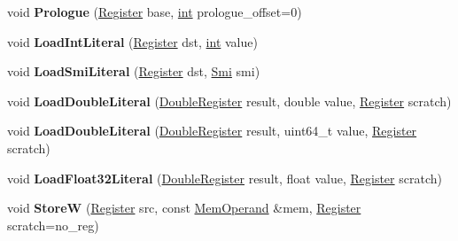 \begin{DoxyCompactItemize}
void {\bfseries Prologue} (\mbox{\hyperlink{classv8_1_1internal_1_1Register}{Register}} base, \mbox{\hyperlink{classint}{int}} prologue\+\_\+offset=0)
\item 
\mbox{\label{classv8_1_1internal_1_1TurboAssembler_a5c9e987ef48da30ebf3964f23479b643}} 
void {\bfseries Load\+Int\+Literal} (\mbox{\hyperlink{classv8_1_1internal_1_1Register}{Register}} dst, \mbox{\hyperlink{classint}{int}} value)
\item 
\mbox{\label{classv8_1_1internal_1_1TurboAssembler_aa0b2abed7ecde2ddb1b5781269353d46}} 
void {\bfseries Load\+Smi\+Literal} (\mbox{\hyperlink{classv8_1_1internal_1_1Register}{Register}} dst, \mbox{\hyperlink{classv8_1_1internal_1_1Smi}{Smi}} smi)
\item 
\mbox{\label{classv8_1_1internal_1_1TurboAssembler_abf5f600547214c85fea42b2c581576c2}} 
void {\bfseries Load\+Double\+Literal} (\mbox{\hyperlink{classv8_1_1internal_1_1DoubleRegister}{Double\+Register}} result, double value, \mbox{\hyperlink{classv8_1_1internal_1_1Register}{Register}} scratch)
\item 
\mbox{\label{classv8_1_1internal_1_1TurboAssembler_aeb4fc9100d733f2697f02e4218f991e9}} 
void {\bfseries Load\+Double\+Literal} (\mbox{\hyperlink{classv8_1_1internal_1_1DoubleRegister}{Double\+Register}} result, uint64\+\_\+t value, \mbox{\hyperlink{classv8_1_1internal_1_1Register}{Register}} scratch)
\item 
\mbox{\label{classv8_1_1internal_1_1TurboAssembler_a18bb818c9afe513c5243932c4bf0deb5}} 
void {\bfseries Load\+Float32\+Literal} (\mbox{\hyperlink{classv8_1_1internal_1_1DoubleRegister}{Double\+Register}} result, float value, \mbox{\hyperlink{classv8_1_1internal_1_1Register}{Register}} scratch)
\item 
\mbox{\label{classv8_1_1internal_1_1TurboAssembler_afb3de2419b6fdfd8d7e4780250c043f7}} 
void {\bfseries StoreW} (\mbox{\hyperlink{classv8_1_1internal_1_1Register}{Register}} src, const \mbox{\hyperlink{classv8_1_1internal_1_1MemOperand}{Mem\+Operand}} \&mem, \mbox{\hyperlink{classv8_1_1internal_1_1Register}{Register}} scratch=no\+\_\+reg)

\end{DoxyCompactItemize}
